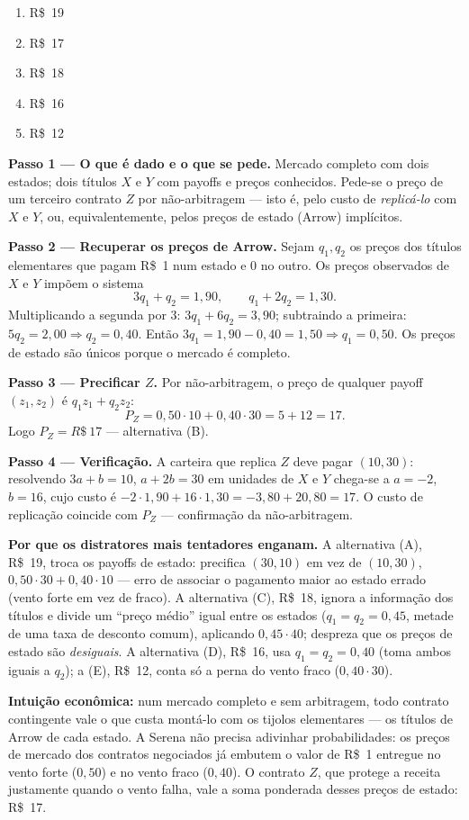 \begin{enumerate}[label=\Alph*., leftmargin=3.2em, itemsep=0.15em, topsep=0.2em]
  \item R\$~19
  \item R\$~17
  \item R\$~18
  \item R\$~16
  \item R\$~12
\end{enumerate}
\begin{solucao}
\textbf{Passo 1 --- O que é dado e o que se pede.} Mercado completo com dois estados; dois títulos $X$ e $Y$ com payoffs e preços conhecidos. Pede-se o preço de um terceiro contrato $Z$ por não-arbitragem --- isto é, pelo custo de \emph{replicá-lo} com $X$ e $Y$, ou, equivalentemente, pelos preços de estado (Arrow) implícitos.

\textbf{Passo 2 --- Recuperar os preços de Arrow.} Sejam $q_1,q_2$ os preços dos títulos elementares que pagam R\$~1 num estado e $0$ no outro. Os preços observados de $X$ e $Y$ impõem o sistema
\[ 3q_1 + q_2 = 1{,}90, \qquad q_1 + 2q_2 = 1{,}30. \]
Multiplicando a segunda por $3$: $3q_1 + 6q_2 = 3{,}90$; subtraindo a primeira: $5q_2 = 2{,}00 \Rightarrow q_2 = 0{,}40$. Então $3q_1 = 1{,}90 - 0{,}40 = 1{,}50 \Rightarrow q_1 = 0{,}50$. Os preços de estado são únicos porque o mercado é completo.

\textbf{Passo 3 --- Precificar $Z$.} Por não-arbitragem, o preço de qualquer payoff $(z_1,z_2)$ é $q_1 z_1 + q_2 z_2$:
\[ P_Z = 0{,}50\cdot 10 + 0{,}40\cdot 30 = 5 + 12 = 17. \]
Logo $P_Z = R\$~17$ --- alternativa (B).

\textbf{Passo 4 --- Verificação.} A carteira que replica $Z$ deve pagar $(10,30)$: resolvendo $3a+b=10$, $a+2b=30$ em unidades de $X$ e $Y$ chega-se a $a=-2$, $b=16$, cujo custo é $-2\cdot 1{,}90 + 16\cdot 1{,}30 = -3{,}80 + 20{,}80 = 17$. O custo de replicação coincide com $P_Z$ --- confirmação da não-arbitragem.

\textbf{Por que os distratores mais tentadores enganam.} A alternativa (A), R\$~19, troca os payoffs de estado: precifica $(30,10)$ em vez de $(10,30)$, $0{,}50\cdot 30 + 0{,}40\cdot 10$ --- erro de associar o pagamento maior ao estado errado (vento forte em vez de fraco). A alternativa (C), R\$~18, ignora a informação dos títulos e divide um ``preço médio'' igual entre os estados ($q_1=q_2=0{,}45$, metade de uma taxa de desconto comum), aplicando $0{,}45\cdot 40$; despreza que os preços de estado são \emph{desiguais}. A alternativa (D), R\$~16, usa $q_1=q_2=0{,}40$ (toma ambos iguais a $q_2$); a (E), R\$~12, conta só a perna do vento fraco ($0{,}40\cdot 30$).

\textbf{Intuição econômica:} num mercado completo e sem arbitragem, todo contrato contingente vale o que custa montá-lo com os tijolos elementares --- os títulos de Arrow de cada estado. A Serena não precisa adivinhar probabilidades: os preços de mercado dos contratos negociados já embutem o valor de R\$~1 entregue no vento forte ($0{,}50$) e no vento fraco ($0{,}40$). O contrato $Z$, que protege a receita justamente quando o vento falha, vale a soma ponderada desses preços de estado: R\$~17.
\end{solucao}

